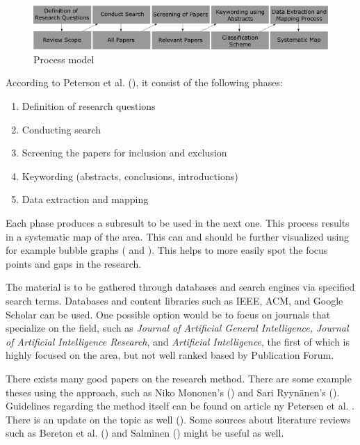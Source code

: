 \documentclass[utf8,english]{gradu3}
\begin{document}

\begin{figure}
  \includegraphics[width=\linewidth]{images/method_graph_L.png}
  \caption{Process model \cite{petersen2008}}
  \label{fig:mapping}
\end{figure}



According to Peterson et al. (\cite*{petersen2008}), it consist of the following phases:
\begin{enumerate}
    \item Definition of research questions
    \item Conducting search
    \item Screening the papers for inclusion and exclusion
    \item Keywording (abstracts, conclusions, introductions)
    \item Data extraction and mapping
\end{enumerate}

Each phase produces a subresult to be used in the next one. This process results in a systematic map of the area. This can and should be further visualized using for example bubble graphs (\cite{mononen2018} and \cite{petersen2008}). This helps to more easily spot the focus points and gaps in the research.


The material is to be gathered through databases and search engines via specified search terms. Databases and content libraries such as IEEE, ACM, and Google Scholar can be used. One possible option would be to focus on journals that specialize on the field, such as \textit{Journal of Artificial General Intelligence, Journal of Artificial Intelligence Research}, and \textit{Artificial Intelligence}, the first of which is highly focused on the area, but not well ranked based by Publication Forum. 

There exists many good papers on the research method. There are some example theses using the approach, such as Niko Mononen's (\cite{mononen2018}) and Sari Ryynänen's (\cite{ryynanen2017}). Guidelines regarding the method itself can be found on article ny Petersen et al. \cite*{petersen2008}. There is an update on the topic as well (\cite{petersen2015}). Some sources about literature reviews such as Bereton et al. (\cite*{brereton2007}) and Salminen (\cite*{salminen2011}) might be useful as well.
\end{document}
